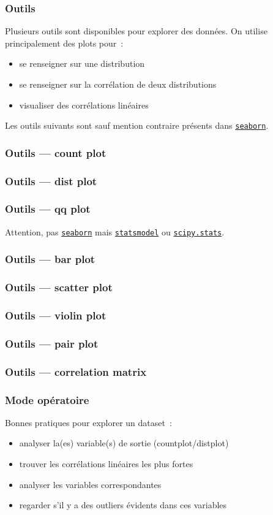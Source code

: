 \begin{frame}
  \frametitle{Outils}
  Plusieurs outils sont disponibles pour explorer des données. On
  utilise principalement des plots pour :
  \begin{itemize}
  \item se renseigner sur une distribution
  \item se renseigner sur la corrélation de deux distributions
  \item visualiser des corrélations linéaires
  \end{itemize}
  Les outils suivants sont sauf mention contraire présents dans
  \href{https://seaborn.pydata.org/}{\texttt{seaborn}}.
\end{frame}

\begin{frame}
  \frametitle{Outils — count plot}
\end{frame}

\begin{frame}
  \frametitle{Outils — dist plot}
\end{frame}

\begin{frame}
  \frametitle{Outils — qq plot}
  Attention, pas \href{https://seaborn.pydata.org/}{\texttt{seaborn}}
  mais
  \href{http://www.statsmodels.org/stable/index.html}{\texttt{statsmodel}}
  ou
  \href{https://docs.scipy.org/doc/scipy/reference/stats.html}{\texttt{scipy.stats}}.
\end{frame}

\begin{frame}
  \frametitle{Outils — bar plot}
\end{frame}

\begin{frame}
  \frametitle{Outils — scatter plot}
\end{frame}

\begin{frame}
  \frametitle{Outils — violin plot}
\end{frame}

\begin{frame}
  \frametitle{Outils — pair plot}
\end{frame}

\begin{frame}
  \frametitle{Outils — correlation matrix}
\end{frame}

\begin{frame}
  \frametitle{Mode opératoire}
  Bonnes pratiques pour explorer un dataset :
  \begin{itemize}[<+->]
  \item analyser la(es) variable(s) de sortie (countplot/distplot)
  \item trouver les corrélations linéaires les plus fortes
  \item analyser les variables correspondantes
  \item regarder s'il y a des outliers évidents dans ces variables
  \end{itemize}
\end{frame}

